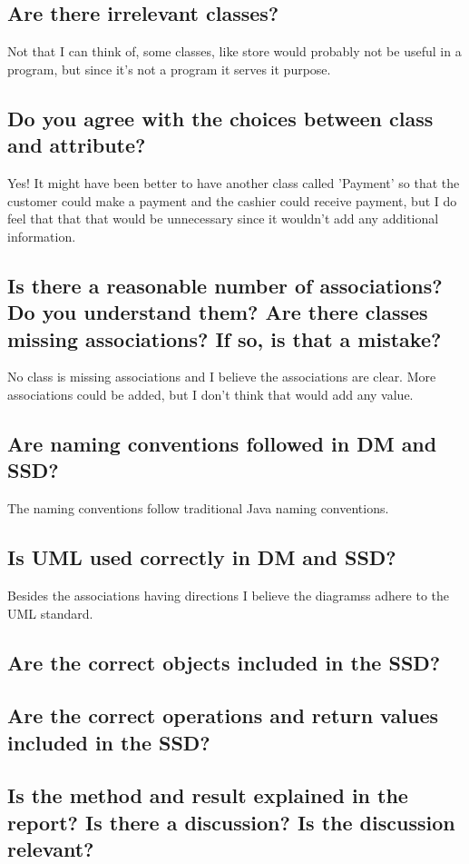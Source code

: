 \documentclass[a4paper]{scrreprt}
\begin{document}
        \subsection{Are there irrelevant classes?}
            Not that I can think of, some classes, like store would probably not
            be useful in a program, but since it's not a program it serves it
            purpose.

        \subsection{Do you agree with the choices between class and attribute?}
            Yes! It might have been better to have another class called 'Payment'
            so that the customer could make a payment and the cashier could
            receive payment, but I do feel that that that would be unnecessary 
            since it wouldn't add any additional information.

        \subsection{Is there a reasonable number of associations? Do you understand them? Are there classes missing associations? If so, is that a mistake?}
            No class is missing associations and I believe the associations are
            clear. More associations could be added, but I don't think that 
            would add any value.

        \subsection{Are naming conventions followed in DM and SSD?}
            The naming conventions follow traditional Java naming conventions.

        \subsection{Is UML used correctly in DM and SSD?}
            Besides the associations having directions I believe the diagramss
            adhere to the UML standard.

        \subsection{Are the correct objects included in the SSD?}


        \subsection{Are the correct operations and return values included in the SSD?}


        \subsection{Is the method and result explained in the report? Is there a discussion? Is the discussion relevant?}

        
\end{document}
